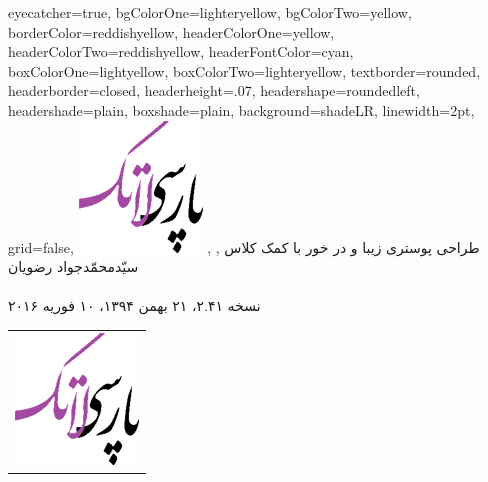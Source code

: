 \documentclass[debug,a0paper]{xebaposter}
\begin{document}

      \begin{poster}%
      {
      eyecatcher=true,
      bgColorOne=lighteryellow,%
      bgColorTwo=yellow,
      borderColor=reddishyellow,
      headerColorOne=yellow,
      headerColorTwo=reddishyellow,
      headerFontColor=cyan,
      boxColorOne=lightyellow,      
      boxColorTwo=lighteryellow,
      textborder=rounded,
      headerborder=closed,
      headerheight=.07\textheight,
      headershape=roundedleft,
      headershade=plain,
      boxshade=plain,
      background=shadeLR,
      linewidth=2pt,
      grid=false, %
      }
 {
      \includegraphics[height=0.05\textheight]{logo}
 }
 {طراحی پوستری زیبا و در خور با کمک کلاس 
}
 {\large {}, , سیّدمحمّدجواد رضویان
 \\%
 {\normalsize\texttt{}
 \\
نسخه ۲.۴۱، ۲۱ بهمن ۱۳۹۴، ۱۰ فوریه ۲۰۱۶
 }}
 {
\begin{tabular}{r}
    \includegraphics[height=0.05 \textheight]{logo}\\
\end{tabular}
 }


\end{poster}
\end{document}
